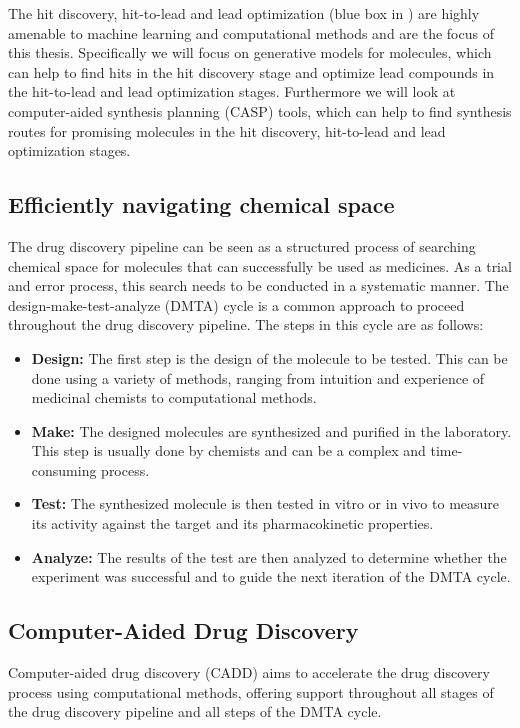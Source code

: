 The hit discovery, hit-to-lead and lead optimization (blue box in
) are highly amenable to machine learning and
computational methods and are the focus of this thesis. Specifically 
we will focus on generative models for molecules, which can help to 
find hits in the hit discovery stage and optimize lead compounds in the
hit-to-lead and lead optimization stages. Furthermore we will look at 
computer-aided synthesis planning (CASP) tools, which can help to find
synthesis routes for promising molecules in the hit discovery, hit-to-lead and lead optimization
stages.

\subsection{Efficiently navigating chemical space}
The drug discovery pipeline can be seen as a structured process of searching
chemical space for molecules that can successfully be used as medicines.
As a trial and error process, this search needs to be conducted in a 
systematic manner. The design-make-test-analyze (DMTA) cycle is a
common approach to proceed throughout the drug discovery pipeline.
The steps in this cycle are as follows:
\begin{itemize}
    \item \textbf{Design:} The first step is the design of the molecule to be
    tested. This can be done using a variety of methods, ranging from 
    intuition and experience of medicinal chemists to computational methods.
    \item \textbf{Make:} The designed molecules are synthesized and purified in
    the laboratory. This step is usually done by chemists and can be a complex
    and time-consuming process.
    \item \textbf{Test:} The synthesized molecule is then tested in vitro or in
    vivo to measure its activity against the target and its pharmacokinetic
    properties.
    \item \textbf{Analyze:} The results of the test are then analyzed to
    determine whether the experiment was successful and to guide the next
    iteration of the DMTA cycle.
\end{itemize}

\subsection{Computer-Aided Drug Discovery}
Computer-aided drug discovery (CADD) aims to accelerate the drug discovery
process using computational methods, offering support throughout all stages of 
the drug discovery pipeline and all steps of the DMTA cycle.

